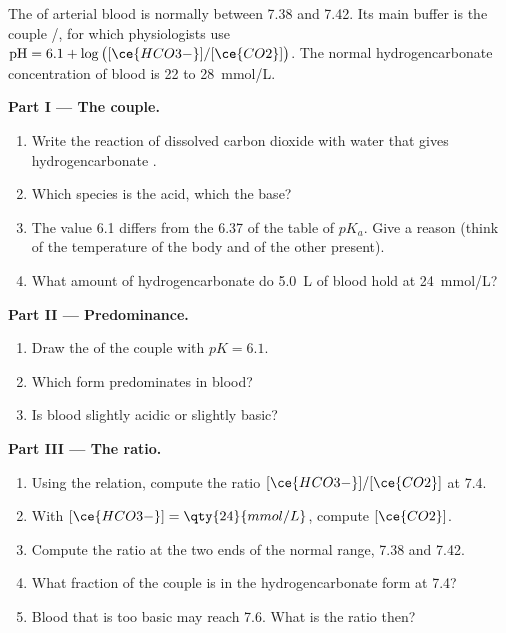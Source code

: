 \begin{problem}
\label{pb:g12:buffers-predominance:1}
The  of arterial blood is normally between 7.38 and 7.42. Its main
buffer is the couple /, for which physiologists use
$\mathrm{pH} = 6.1 + \log\big([\ce{HCO3-}]/[\ce{CO2}]\big)$. The normal
hydrogencarbonate concentration of blood is 22 to \qty{28}{mmol/L}.

\medskip
\noindent\textbf{Part I --- The couple.}
\begin{enumerate}
  \item Write the reaction of dissolved carbon dioxide with water that
        gives hydrogencarbonate .
  \item Which species is the acid, which the base?
  \item The value 6.1 differs from the 6.37 of the table of $pK_a$. Give a
        reason (think of the temperature of the body and of the other
         present).
  \item What amount of hydrogencarbonate do \qty{5.0}{L} of blood hold
        at \qty{24}{mmol/L}?
\end{enumerate}

\medskip
\noindent\textbf{Part II --- Predominance.}
\begin{enumerate}[resume]
  \item Draw the  of the couple with $pK = 6.1$.
  \item Which form predominates in blood?
  \item Is blood slightly acidic or slightly basic?
\end{enumerate}

\medskip
\noindent\textbf{Part III --- The ratio.}
\begin{enumerate}[resume]
  \item Using the relation, compute the ratio $[\ce{HCO3-}]/[\ce{CO2}]$
        at  7.4.
  \item With $[\ce{HCO3-}] = \qty{24}{mmol/L}$, compute $[\ce{CO2}]$.
  \item Compute the ratio at the two ends of the normal range, 7.38 and
        7.42.
  \item What fraction of the couple is in the hydrogencarbonate form at
         7.4?
  \item Blood that is too basic may reach  7.6. What is the ratio
        then?
\end{enumerate}


\end{problem}
